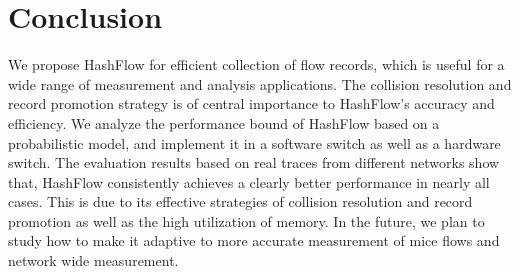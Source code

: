 \section{Conclusion}
\label{section:conclusion}
We propose HashFlow for efficient collection of flow records, 
which is useful for a wide range of measurement and analysis applications. 
The collision resolution and record promotion strategy is of central importance 
to HashFlow's accuracy and efficiency. We analyze the performance bound 
of HashFlow based on a probabilistic model, and implement it in a software switch as well as a hardware switch. 
The evaluation results based on real traces from different networks show that, 
HashFlow consistently achieves a clearly better performance in nearly all cases. 
This is due to its effective strategies of collision resolution and record promotion as well as the high utilization of memory.
In the future, we plan to study how to make it adaptive to more accurate measurement of mice flows and network wide measurement.
